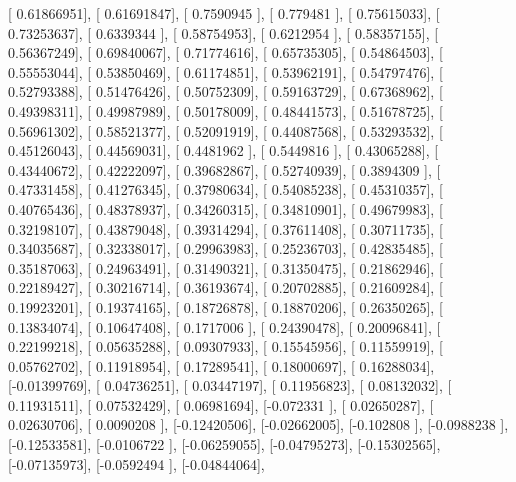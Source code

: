 \documentclass{article}
\begin{document}
       [ 0.61866951],
       [ 0.61691847],
       [ 0.7590945 ],
       [ 0.779481  ],
       [ 0.75615033],
       [ 0.73253637],
       [ 0.6339344 ],
       [ 0.58754953],
       [ 0.6212954 ],
       [ 0.58357155],
       [ 0.56367249],
       [ 0.69840067],
       [ 0.71774616],
       [ 0.65735305],
       [ 0.54864503],
       [ 0.55553044],
       [ 0.53850469],
       [ 0.61174851],
       [ 0.53962191],
       [ 0.54797476],
       [ 0.52793388],
       [ 0.51476426],
       [ 0.50752309],
       [ 0.59163729],
       [ 0.67368962],
       [ 0.49398311],
       [ 0.49987989],
       [ 0.50178009],
       [ 0.48441573],
       [ 0.51678725],
       [ 0.56961302],
       [ 0.58521377],
       [ 0.52091919],
       [ 0.44087568],
       [ 0.53293532],
       [ 0.45126043],
       [ 0.44569031],
       [ 0.4481962 ],
       [ 0.5449816 ],
       [ 0.43065288],
       [ 0.43440672],
       [ 0.42222097],
       [ 0.39682867],
       [ 0.52740939],
       [ 0.3894309 ],
       [ 0.47331458],
       [ 0.41276345],
       [ 0.37980634],
       [ 0.54085238],
       [ 0.45310357],
       [ 0.40765436],
       [ 0.48378937],
       [ 0.34260315],
       [ 0.34810901],
       [ 0.49679983],
       [ 0.32198107],
       [ 0.43879048],
       [ 0.39314294],
       [ 0.37611408],
       [ 0.30711735],
       [ 0.34035687],
       [ 0.32338017],
       [ 0.29963983],
       [ 0.25236703],
       [ 0.42835485],
       [ 0.35187063],
       [ 0.24963491],
       [ 0.31490321],
       [ 0.31350475],
       [ 0.21862946],
       [ 0.22189427],
       [ 0.30216714],
       [ 0.36193674],
       [ 0.20702885],
       [ 0.21609284],
       [ 0.19923201],
       [ 0.19374165],
       [ 0.18726878],
       [ 0.18870206],
       [ 0.26350265],
       [ 0.13834074],
       [ 0.10647408],
       [ 0.1717006 ],
       [ 0.24390478],
       [ 0.20096841],
       [ 0.22199218],
       [ 0.05635288],
       [ 0.09307933],
       [ 0.15545956],
       [ 0.11559919],
       [ 0.05762702],
       [ 0.11918954],
       [ 0.17289541],
       [ 0.18000697],
       [ 0.16288034],
       [-0.01399769],
       [ 0.04736251],
       [ 0.03447197],
       [ 0.11956823],
       [ 0.08132032],
       [ 0.11931511],
       [ 0.07532429],
       [ 0.06981694],
       [-0.072331  ],
       [ 0.02650287],
       [ 0.02630706],
       [ 0.0090208 ],
       [-0.12420506],
       [-0.02662005],
       [-0.102808  ],
       [-0.0988238 ],
       [-0.12533581],
       [-0.0106722 ],
       [-0.06259055],
       [-0.04795273],
       [-0.15302565],
       [-0.07135973],
       [-0.0592494 ],
       [-0.04844064],
\end{document}

